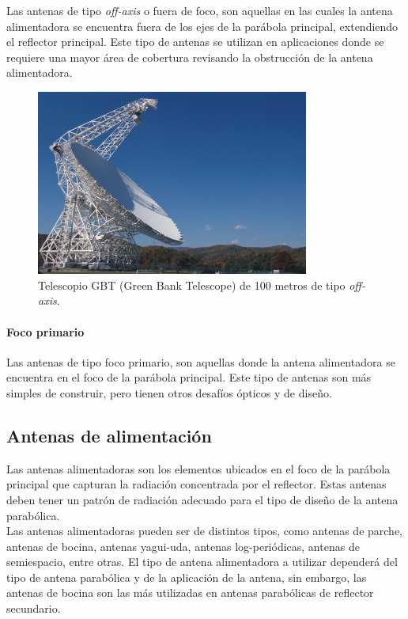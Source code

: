 Las antenas de tipo \textit{off-axis} o fuera de foco, son aquellas en las cuales la antena alimentadora se encuentra fuera de los ejes de la parábola principal, extendiendo el reflector principal. Este tipo de antenas se utilizan en aplicaciones donde se requiere una mayor área de cobertura revisando la obstrucción de la antena alimentadora.

\begin{figure}
    \centering
    \includegraphics[width = 0.8\textwidth]{img/off-axis.jpg}
    \caption{Telescopio GBT (Green Bank Telescope) de 100 metros de tipo \textit{off-axis}.}
    \label{fig:off}
\end{figure}


\paragraph{Foco primario}

Las antenas de tipo foco primario, son aquellas donde la antena alimentadora se encuentra en el foco de la parábola principal. Este tipo de antenas son más simples de construir, pero tienen otros desafíos ópticos y de diseño.\\

\subsection{Antenas de alimentación}

Las antenas alimentadoras son los elementos ubicados en el foco de la parábola principal que capturan la radiación concentrada por el reflector. Estas antenas deben tener un patrón de radiación adecuado para el tipo de diseño de la antena parabólica.\\

Las antenas alimentadoras pueden ser de distintos tipos, como antenas de parche, antenas de bocina, antenas yagui-uda, antenas log-periódicas, antenas de semiespacio, entre otras. El tipo de antena alimentadora a utilizar dependerá del tipo de antena parabólica y de la aplicación de la antena, sin embargo, las antenas de bocina son las más utilizadas en antenas parabólicas de reflector secundario.\\


